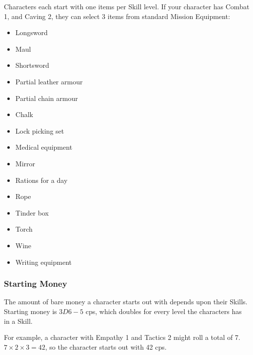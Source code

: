 \begin{multicols}{2}

Characters each start with one items per Skill level.
If your character has Combat 1, and Caving 2, they can select 3 items from standard Mission Equipment:

\begin{multicols}{2}
\begin{itemize}

  \item
  Longsword
  \item
  Maul
  \item
  Shortsword
  \item
  Partial leather armour
  \item
  Partial chain armour
  \item
  Chalk
  \item
  Lock picking set
  \item
  Medical equipment
  \item
  Mirror
  \item
  Rations for a day
  \item
  Rope
  \item
  Tinder box
  \item
  Torch
  \item
  Wine
  \item
  Writing equipment

\end{itemize}
\end{multicols}

\subsubsection{Starting Money}

The amount of bare money a character starts out with depends upon their Skills.
Starting money is $3D6-5$ \glspl{cp}, which doubles for every level the characters has in a Skill.

For example, a character with Empathy 1 and Tactics 2 might roll a total of 7.
$7\times2\times3 = 42$, so the character starts out with 42 \glspl{cp}.

\end{multicols}

